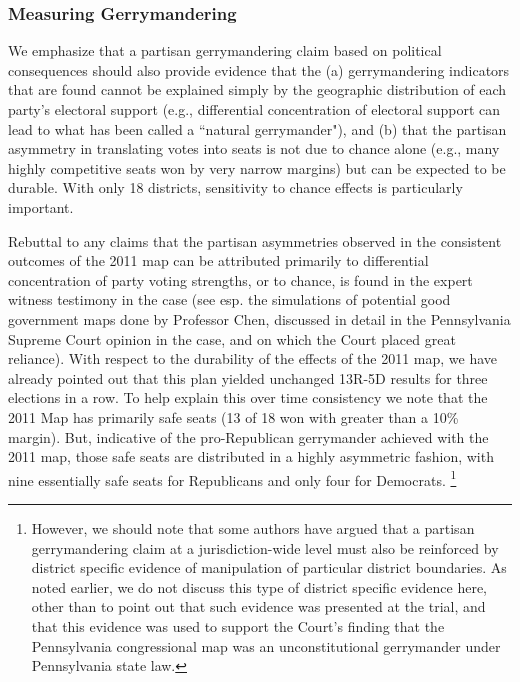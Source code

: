             \subsubsection*{Measuring Gerrymandering}
    We emphasize that a partisan gerrymandering claim based on political consequences should also provide evidence that the (a) gerrymandering indicators that are found cannot be explained simply by the geographic distribution of each party’s electoral support (e.g., differential concentration of electoral support can lead to what has been called a ``natural gerrymander"), and (b) that the partisan asymmetry in translating votes into seats is not due to chance alone (e.g., many highly competitive seats won by very narrow margins) but can be expected to be durable. With only 18 districts, sensitivity to chance effects is particularly important. 
\par
    Rebuttal to any claims that the partisan asymmetries observed in the consistent outcomes of the 2011 map can be attributed primarily to differential concentration of party voting strengths, or to chance, is found in the expert witness testimony in the case (see esp. the simulations of potential good government maps done by Professor Chen, discussed in detail in the Pennsylvania Supreme Court opinion in the case, and on which the Court placed great reliance). With respect to the durability of the effects of the 2011 map, we have already pointed out that this plan yielded unchanged 13R-5D results for three elections in a row. To help explain this over time consistency we note that the 2011 Map has primarily safe seats (13 of 18 won with greater than a 10\% margin). But, indicative of the pro-Republican gerrymander achieved with the 2011 map, those safe seats are distributed in a highly asymmetric fashion, with nine essentially safe seats for Republicans and only four for Democrats.
        \footnote{However, we should note that some authors \citep[e.g.,][]{Grofman2019_ELJ} have argued that a partisan gerrymandering claim at a jurisdiction-wide level must also be reinforced by district specific evidence of manipulation of particular district boundaries. As noted earlier, we do not discuss this type of district specific evidence here, other than to point out that such evidence was presented at the trial, and that this evidence was used to support the Court’s finding that the Pennsylvania congressional map was an unconstitutional gerrymander under Pennsylvania state law.}





